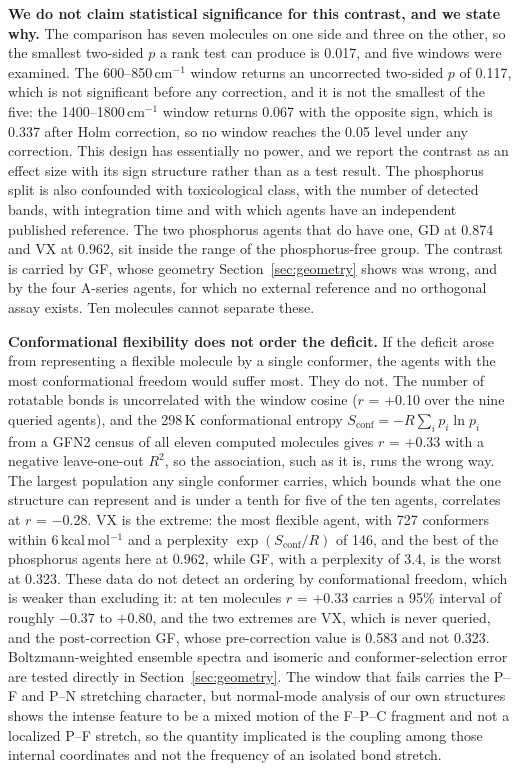 \documentclass[review,12pt]{elsarticle}
\newcommand*\wn{\ensuremath{\text{cm}^{-1}}}
\begin{document}
\textbf{We do not claim statistical significance for this contrast, and we state why.}
The comparison has seven molecules on one side and three on the other, so the smallest
two-sided $p$ a rank test can produce is 0.017, and five windows were examined. The
600--850\,\wn{} window returns an uncorrected two-sided $p$ of 0.117, which is not
significant before any correction, and it is not the smallest of the five: the
1400--1800\,\wn{} window returns 0.067 with the opposite sign, which is 0.337 after Holm
correction, so no window reaches the 0.05 level under any correction. This design has
essentially no power, and we report the contrast as an effect size with its sign
structure rather than as a test result. The phosphorus split is also confounded with
toxicological class, with the number of detected bands, with integration time and with
which agents have an independent published reference. The two phosphorus agents that do
have one, GD at 0.874 and VX at 0.962, sit inside the range of the phosphorus-free group.
The contrast is carried by GF, whose geometry Section~\ref{sec:geometry} shows was wrong,
and by the four A-series agents, for which no external reference and no orthogonal assay
exists. Ten molecules cannot separate these.

\textbf{Conformational flexibility does not order the deficit.} If the deficit arose from representing a flexible molecule by a single conformer, the agents with the most conformational freedom would suffer most. They do not. The number of rotatable bonds is uncorrelated with the window cosine ($r$ = +0.10 over the nine queried agents), and the 298\,K conformational entropy $S_\mathrm{conf} = -R\sum_i p_i \ln p_i$ from a GFN2 census of all eleven computed molecules gives $r$ = +0.33 with a negative leave-one-out $R^2$, so the association, such as it is, runs the wrong way. The largest population any single conformer carries, which bounds what the one structure can represent and is under a tenth for five of the ten agents, correlates at $r$ = $-$0.28. VX is the extreme: the most flexible agent, with 727 conformers within 6\,kcal\,mol$^{-1}$ and a perplexity $\exp(S_\mathrm{conf}/R)$ of 146, and the best of the phosphorus agents here at 0.962, while GF, with a perplexity of 3.4, is the worst at 0.323. These data do not detect an ordering by conformational freedom, which is weaker than excluding it: at ten molecules $r$ = +0.33 carries a 95\% interval of roughly $-0.37$ to $+0.80$, and the two extremes are VX, which is never queried, and the post-correction GF, whose pre-correction value is 0.583 and not 0.323. Boltzmann-weighted ensemble spectra and isomeric and conformer-selection error are tested directly in Section~\ref{sec:geometry}. The window that fails carries the P--F and P--N stretching character, but normal-mode analysis of our own structures shows the intense feature to be a mixed motion of the F--P--C fragment and not a localized P--F stretch, so the quantity implicated is the coupling among those internal coordinates and not the frequency of an isolated bond stretch.
\end{document}
